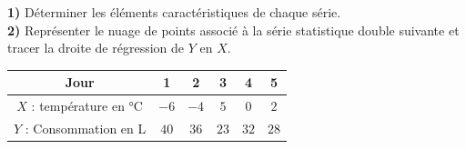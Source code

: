 \documentclass[11pt,a4paper]{article}
\begin{document}
\begin{tcolorbox}[colback=lightblue!20, colframe=darkblue, title=\textbf{Objectifs}, arc=2mm, boxrule=0.8pt]
    \small
    \textbf{1)} Déterminer les éléments caractéristiques de chaque série. \\[0.1cm]
    \textbf{2)} Représenter le nuage de points associé à la série statistique double suivante et tracer la droite de régression de $Y$ en $X$.
    
    \vspace{0.2cm}
    \begin{center}
    \small
    \begin{tabular}{|c|c|c|c|c|c|}
        \hline
        \textbf{Jour} & 1 & 2 & 3 & 4 & 5 \\
        \hline
        $X$ : température en °C & $-6$ & $-4$ & $5$ & $0$ & $2$ \\
        \hline
        $Y$ : Consommation en L & $40$ & $36$ & $23$ & $32$ & $28$ \\
        \hline
    \end{tabular}
    \end{center}
\end{tcolorbox}

\vspace{0.2cm}
\end{document}
